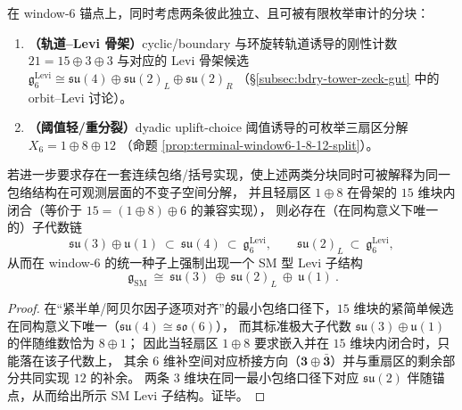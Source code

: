 \begin{proposition}\label{prop:window6-common-refinement-sm-levi}
在 window-\(6\) 锚点上，同时考虑两条彼此独立、且可被有限枚举审计的分块：
\begin{enumerate}
  \item \textbf{（轨道--Levi 骨架）}cyclic/boundary 与环旋转轨道诱导的刚性计数
  \(
  21=15\oplus 3\oplus 3
  \)
  与对应的 Levi 骨架候选
  \(
  \mathfrak g_6^{\mathrm{Levi}}\cong \mathfrak{su}(4)\oplus\mathfrak{su}(2)_L\oplus\mathfrak{su}(2)_R
  \)
  （\S\ref{subsec:bdry-tower-zeck-gut} 中的 orbit--Levi 讨论）。
  \item \textbf{（阈值轻/重分裂）}dyadic uplift-choice 阈值诱导的可枚举三扇区分解
  \(
  X_6=1\oplus 8\oplus 12
  \)
  （命题 \ref{prop:terminal-window6-1-8-12-split}）。
\end{enumerate}
若进一步要求存在一套连续包络/括号实现，使上述两类分块同时可被解释为同一包络结构在可观测层面的不变子空间分解，
并且轻扇区 \(1\oplus 8\) 在骨架的 \(15\) 维块内闭合（等价于 \(15=(1\oplus 8)\oplus 6\) 的兼容实现），
则必存在（在同构意义下唯一的）子代数链
\[
\mathfrak{su}(3)\oplus\mathfrak u(1)\ \subset\ \mathfrak{su}(4)\ \subset\ \mathfrak g_6^{\mathrm{Levi}},
\qquad
\mathfrak{su}(2)_L\ \subset\ \mathfrak g_6^{\mathrm{Levi}},
\]
从而在 window-\(6\) 的统一种子上强制出现一个 SM 型 Levi 子结构
\[
\boxed{\ \mathfrak g_{\mathrm{SM}}\ \cong\ \mathfrak{su}(3)\ \oplus\ \mathfrak{su}(2)_L\ \oplus\ \mathfrak u(1)\ }.
\]
\end{proposition}
\begin{proof}
在“紧半单/阿贝尔因子逐项对齐”的最小包络口径下，\(15\) 维块的紧简单候选在同构意义下唯一（\(\mathfrak{su}(4)\cong\mathfrak{so}(6)\)），
而其标准极大子代数 \(\mathfrak{su}(3)\oplus\mathfrak u(1)\) 的伴随维数恰为 \(8\oplus 1\)；
因此当轻扇区 \(1\oplus 8\) 要求嵌入并在 \(15\) 维块内闭合时，只能落在该子代数上，
其余 \(6\) 维补空间对应桥接方向（\(\mathbf3\oplus\bar{\mathbf3}\)）并与重扇区的剩余部分共同实现 \(12\) 的补余。
两条 \(3\) 维块在同一最小包络口径下对应 \(\mathfrak{su}(2)\) 伴随锚点，从而给出所示 SM Levi 子结构。证毕。
\end{proof}

